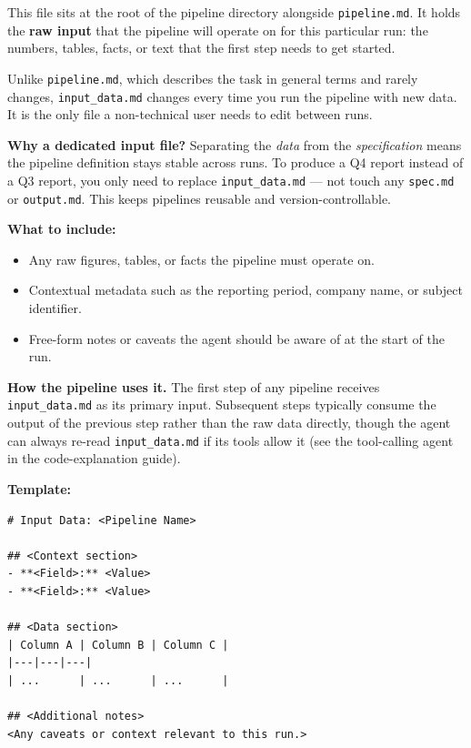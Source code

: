 \documentclass[12pt, a4paper]{article}
\begin{document}
This file sits at the root of the pipeline directory alongside \texttt{pipeline.md}. It holds the \textbf{raw input} that the pipeline will operate on for this particular run: the numbers, tables, facts, or text that the first step needs to get started.

Unlike \texttt{pipeline.md}, which describes the task in general terms and rarely changes, \texttt{input\_data.md} changes every time you run the pipeline with new data. It is the only file a non-technical user needs to edit between runs.

\begin{notebox}
\textbf{Why a dedicated input file?} Separating the \textit{data} from the \textit{specification} means the pipeline definition stays stable across runs. To produce a Q4 report instead of a Q3 report, you only need to replace \texttt{input\_data.md} — not touch any \texttt{spec.md} or \texttt{output.md}. This keeps pipelines reusable and version-controllable.
\end{notebox}

\textbf{What to include:}

\begin{itemize}[leftmargin=1.5em]
  \item Any raw figures, tables, or facts the pipeline must operate on.
  \item Contextual metadata such as the reporting period, company name, or subject identifier.
  \item Free-form notes or caveats the agent should be aware of at the start of the run.
\end{itemize}

\textbf{How the pipeline uses it.} The first step of any pipeline receives \texttt{input\_data.md} as its primary input. Subsequent steps typically consume the output of the previous step rather than the raw data directly, though the agent can always re-read \texttt{input\_data.md} if its tools allow it (see the tool-calling agent in the code-explanation guide).

\textbf{Template:}

\begin{lstlisting}[language={}]
# Input Data: <Pipeline Name>

## <Context section>
- **<Field>:** <Value>
- **<Field>:** <Value>

## <Data section>
| Column A | Column B | Column C |
|---|---|---|
| ...      | ...      | ...      |

## <Additional notes>
<Any caveats or context relevant to this run.>
\end{lstlisting}
\end{document}
